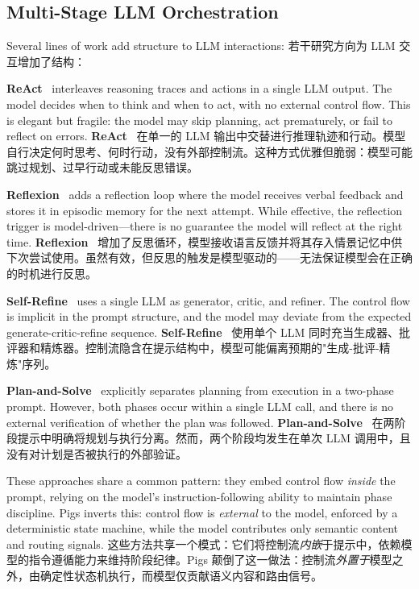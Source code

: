 \subsection{Multi-Stage LLM Orchestration}

Several lines of work add structure to LLM interactions:
若干研究方向为 LLM 交互增加了结构：

\textbf{ReAct}~\citep{yao2022react} interleaves reasoning traces and actions in a single LLM output. The model decides when to think and when to act, with no external control flow. This is elegant but fragile: the model may skip planning, act prematurely, or fail to reflect on errors.
\textbf{ReAct}~\citep{yao2022react} 在单一的 LLM 输出中交替进行推理轨迹和行动。模型自行决定何时思考、何时行动，没有外部控制流。这种方式优雅但脆弱：模型可能跳过规划、过早行动或未能反思错误。

\textbf{Reflexion}~\citep{shinn2023reflexion} adds a reflection loop where the model receives verbal feedback and stores it in episodic memory for the next attempt. While effective, the reflection trigger is model-driven---there is no guarantee the model will reflect at the right time.
\textbf{Reflexion}~\citep{shinn2023reflexion} 增加了反思循环，模型接收语言反馈并将其存入情景记忆中供下次尝试使用。虽然有效，但反思的触发是模型驱动的——无法保证模型会在正确的时机进行反思。

\textbf{Self-Refine}~\citep{madaan2023selfrefine} uses a single LLM as generator, critic, and refiner. The control flow is implicit in the prompt structure, and the model may deviate from the expected generate-critic-refine sequence.
\textbf{Self-Refine}~\citep{madaan2023selfrefine} 使用单个 LLM 同时充当生成器、批评器和精炼器。控制流隐含在提示结构中，模型可能偏离预期的"生成-批评-精炼"序列。

\textbf{Plan-and-Solve}~\citep{wang2023plan} explicitly separates planning from execution in a two-phase prompt. However, both phases occur within a single LLM call, and there is no external verification of whether the plan was followed.
\textbf{Plan-and-Solve}~\citep{wang2023plan} 在两阶段提示中明确将规划与执行分离。然而，两个阶段均发生在单次 LLM 调用中，且没有对计划是否被执行的外部验证。

These approaches share a common pattern: they embed control flow \emph{inside} the prompt, relying on the model's instruction-following ability to maintain phase discipline. Pigs inverts this: control flow is \emph{external} to the model, enforced by a deterministic state machine, while the model contributes only semantic content and routing signals.
这些方法共享一个模式：它们将控制流\emph{内嵌}于提示中，依赖模型的指令遵循能力来维持阶段纪律。Pigs 颠倒了这一做法：控制流\emph{外置于}模型之外，由确定性状态机执行，而模型仅贡献语义内容和路由信号。

